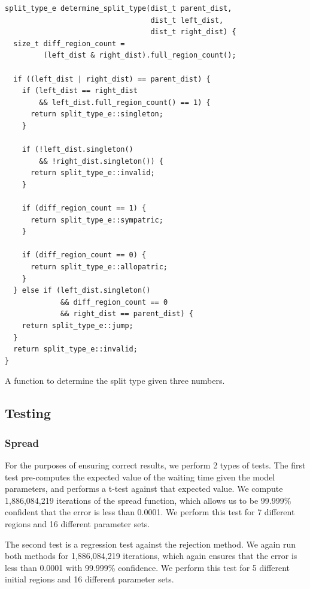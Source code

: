 \documentclass{article}
\begin{document}

\begin{listing}
	\begin{verbatim}
split_type_e determine_split_type(dist_t parent_dist, 
                                  dist_t left_dist, 
                                  dist_t right_dist) {
  size_t diff_region_count =
         (left_dist & right_dist).full_region_count();

  if ((left_dist | right_dist) == parent_dist) {
    if (left_dist == right_dist 
        && left_dist.full_region_count() == 1) {
      return split_type_e::singleton;
    }

    if (!left_dist.singleton() 
        && !right_dist.singleton()) {
      return split_type_e::invalid;
    }

    if (diff_region_count == 1) {
      return split_type_e::sympatric;
    }

    if (diff_region_count == 0) {
      return split_type_e::allopatric;
    }
  } else if (left_dist.singleton()
             && diff_region_count == 0
             && right_dist == parent_dist) {
    return split_type_e::jump;
  }
  return split_type_e::invalid;
}
\end{verbatim}
	\caption{A function to determine the split type given three numbers.}
	\label{lst:determine-split-type}
\end{listing}

\subsection{Testing}

\subsubsection{Spread}

For the purposes of ensuring correct results, we perform 2 types of tests.
The first test pre-computes the expected value of the waiting time given the
model parameters, and performs a t-test against that expected value.
We compute 1,886,084,219 iterations of the spread function, which allows us to
be 99.999\% confident that the error is less than 0.0001.
We perform this test for 7 different regions and 16 different parameter sets.

The second test is a regression test against the rejection method.
We again run both methods for 1,886,084,219 iterations, which again ensures
that the error is less than 0.0001 with 99.999\% confidence.
We perform this test for 5 different initial regions and 16 different parameter
sets.
\end{document}
